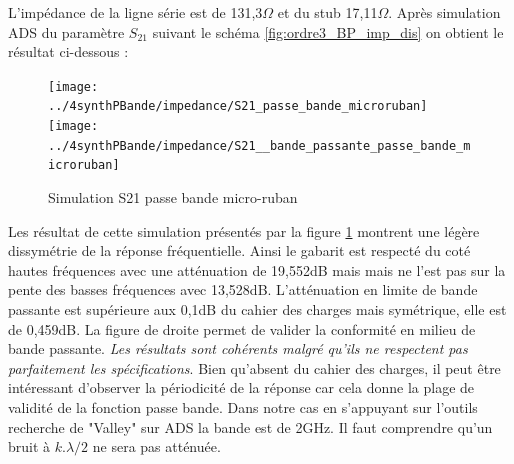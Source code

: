\documentclass[french]{article}
\begin{document}
L'impédance de la ligne série est de 131,3$\Omega$ et du stub 17,11$\Omega$. Après simulation ADS du paramètre $S_{21}$ suivant le schéma \ref{fig:ordre3_BP_imp_dis} on obtient le résultat ci-dessous :
\begin{figure}[H]
	\centering
	\texttt{[image: ../4synthPBande/impedance/S21\_passe\_bande\_microruban]}
	\texttt{[image: ../4synthPBande/impedance/S21\_\_bande\_passante\_passe\_bande\_microruban]}
	\caption{Simulation S21 passe bande micro-ruban}
	\label{fig:ads_S21_BP_microruban}
\end{figure}
Les résultat de cette simulation présentés par la figure \ref{fig:ads_S21_BP_microruban} montrent une légère dissymétrie de la réponse fréquentielle. Ainsi le gabarit est respecté du coté hautes fréquences avec une atténuation de 19,552dB mais mais ne l'est pas sur la pente des basses fréquences avec 13,528dB. L'atténuation en limite de bande passante est supérieure aux 0,1dB du cahier des charges mais symétrique, elle est de 0,459dB. La figure de droite permet de valider la conformité en milieu de bande passante. \emph{Les résultats sont cohérents malgré qu'ils ne respectent pas parfaitement les spécifications}. Bien qu'absent du cahier des charges, il peut être intéressant d'observer la périodicité de la réponse car cela donne la plage de validité de la fonction passe bande. Dans notre cas en s'appuyant sur l'outils recherche de "Valley" sur ADS la bande est de 2GHz. Il faut comprendre qu'un bruit à $k.\lambda /2$ ne sera pas atténuée.
\end{document}
